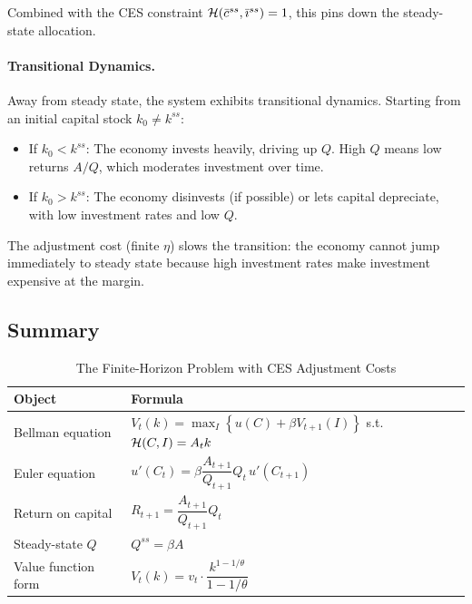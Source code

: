 Combined with the CES constraint $\mathcal{H}(\bar{c}^{ss}, \bar{\imath}^{ss}) = 1$, this pins down the steady-state allocation.

\paragraph{Transitional Dynamics.}
Away from steady state, the system exhibits transitional dynamics. Starting from an initial capital stock $k_0 \neq k^{ss}$:
\begin{itemize}[nosep]
\item If $k_0 < k^{ss}$: The economy invests heavily, driving up $Q$. High $Q$ means low returns $A/Q$, which moderates investment over time.
\item If $k_0 > k^{ss}$: The economy disinvests (if possible) or lets capital depreciate, with low investment rates and low $Q$.
\end{itemize}

The adjustment cost (finite $\eta$) slows the transition: the economy cannot jump immediately to steady state because high investment rates make investment expensive at the margin.

\subsection{Summary}
\label{subsec:ac-T-summary}

\begin{table}[H]
\centering
\caption{The Finite-Horizon Problem with CES Adjustment Costs}
\label{tab:ac-T-summary}
\renewcommand{\arraystretch}{1.6}
\begin{tabular}{@{}ll@{}}
\toprule
\textbf{Object} & \textbf{Formula} \\
\midrule
Bellman equation & $V_t(k) = \max_{I} \left\{ u(C) + \beta V_{t+1}(I) \right\}$ s.t. $\mathcal{H}(C,I) = A_t k$ \\[6pt]
Euler equation & $u'(C_t) = \beta \dfrac{A_{t+1}}{Q_{t+1}} Q_t \, u'(C_{t+1})$ \\[10pt]
Return on capital & $R_{t+1} = \dfrac{A_{t+1}}{Q_{t+1}} Q_t$ \\[10pt]
Steady-state $Q$ & $Q^{ss} = \beta A$ \\[6pt]
Value function form & $V_t(k) = v_t \cdot \dfrac{k^{1-1/\theta}}{1-1/\theta}$ \\[8pt]
\bottomrule
\end{tabular}
\end{table}

